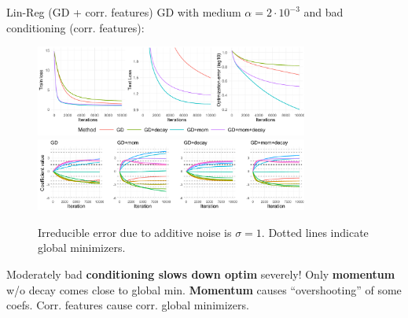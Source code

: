 \documentclass[11pt,compress,t,notes=noshow, xcolor=table]{beamer}
\begin{document}
\begin{vbframe}{Lin-Reg (GD + corr. features)}
\vspace{-0.4cm}
GD with medium $\alpha=2\cdot10^{-3}$ and bad conditioning (corr. features):
\begin{figure}
            \includegraphics[width=0.8\textwidth]{figure_man/simu_linmod/GD_reg_med_lr_corr_iters.pdf} \\
             \includegraphics[width=0.8\textwidth]{figure_man/simu_linmod/GD_reg_coef_med_corr.pdf}\\
            \begin{footnotesize}
                Irreducible error due to additive noise is $\sigma=1$. Dotted lines indicate global minimizers.
            \end{footnotesize}
\end{figure}
\vspace{-0.2cm}
{\footnotesize
Moderately bad \textbf{conditioning slows down optim} severely! Only \textbf{momentum} w/o decay comes close to global min. \textbf{Momentum} causes ``overshooting'' of some coefs. Corr. features cause corr. global minimizers.}
\end{vbframe}
\end{document}
